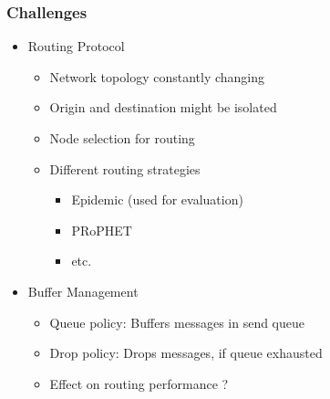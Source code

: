 \begin{frame}
  \frametitle{Challenges}

  \begin{itemize}
    \item Routing Protocol
    \vspace{0.3cm}
    \begin{itemize}
      \item Network topology constantly changing
      \vspace{0.1cm}
      \item Origin and destination might be isolated
      \vspace{0.1cm}
      \item Node selection for routing
      \vspace{0.1cm}
      \item Different routing strategies
      \begin{itemize}
        \item Epidemic (used for evaluation)
        \vspace{0.1cm}
        \item PRoPHET
        \vspace{0.1cm}
        \item etc.
      \end{itemize}
    \end{itemize}
  \end{itemize}

  \vspace{0.3cm}

  \begin{itemize}
    \item Buffer Management
    \vspace{0.3cm}
    \begin{itemize}
      \item Queue policy: Buffers messages in send queue
      \vspace{0.1cm}
      \item Drop policy: Drops messages, if queue exhausted
      \vspace{0.1cm}
      \item Effect on routing performance ?
    \end{itemize}
  \end{itemize}

\end{frame}
